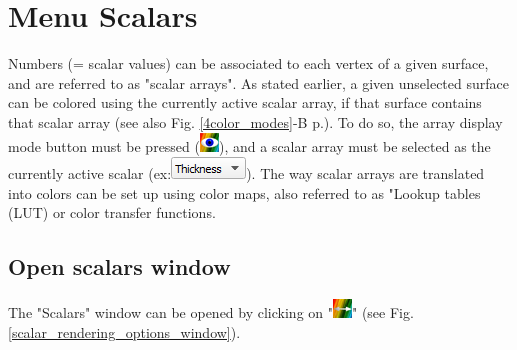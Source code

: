 
\chapter{Menu Scalars}\label{scalars_chapter}
\minitoc 

Numbers (= scalar values) can be associated to each vertex of a given surface, and are referred to as "scalar arrays". 
As stated earlier, a given unselected surface can be colored using the currently active scalar array, if that surface contains that scalar array (see also Fig. \ref{4color_modes}-B p.\pageref{4color_modes}). To do so, the array display mode button must be pressed (\includegraphics[scale=0.7]{images/04/show_color_scale.png}), and a scalar array must be selected as the currently active scalar (ex:\includegraphics[scale=0.5]{images/04/scalarcombo_scalar.png}). The way scalar arrays are translated into colors can be set up using color maps, also referred to as "Lookup tables (LUT) or color transfer functions. 

\section{Open scalars window}
The "Scalars" window can be opened by clicking on "\includegraphics[scale=0.7]{images/04/color_scale_edit.png}" (see Fig. \ref{scalar_rendering_options_window}).

